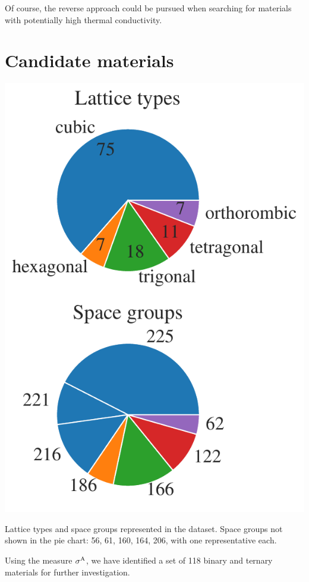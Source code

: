 Of course, the reverse approach could be pursued when searching for materials with potentially high thermal conductivity.

\section{Candidate materials}
\begin{marginfigure}
	\includegraphics[width=\textwidth]{./data/plots/dataset/pies.pdf}
	\caption{
		Lattice types and space groups represented in the dataset. Space groups not shown in the pie chart: 56, 61, 160, 164, 206, with one representative each.
	}
	\label{fig:anh.pie}
\end{marginfigure}
Using the measure $\sigma^\mathrm{A}$, we have identified a set of 118 binary and ternary materials for further investigation.  %
